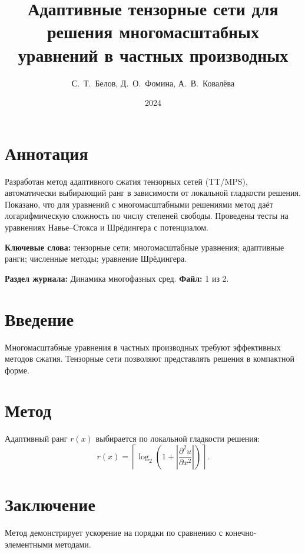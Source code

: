 \documentclass[12pt]{article}
\title{Адаптивные тензорные сети для решения многомасштабных\\ уравнений в частных производных}
\author{С.~Т.~Белов, Д.~О.~Фомина, А.~В.~Ковалёва}
\date{2024}
\begin{document}
\maketitle

\section*{Аннотация}
Разработан метод адаптивного сжатия тензорных сетей (TT/MPS), автоматически выбирающий ранг в зависимости от локальной гладкости решения. Показано, что для уравнений с многомасштабными решениями метод даёт логарифмическую сложность по числу степеней свободы. Проведены тесты на уравнениях Навье–Стокса и Шрёдингера с потенциалом.

\vspace{0.5cm}
\noindent\textbf{Ключевые слова:} тензорные сети; многомасштабные уравнения; адаптивные ранги; численные методы; уравнение Шрёдингера.

\vspace{0.3cm}
\noindent\textbf{Раздел журнала:} Динамика многофазных сред. \quad \textbf{Файл:} 1 из 2.

\section{Введение}
Многомасштабные уравнения в частных производных требуют эффективных методов сжатия. Тензорные сети позволяют представлять решения в компактной форме.

\section{Метод}
Адаптивный ранг $r(x)$ выбирается по локальной гладкости решения:
\begin{equation}
r(x) = \left\lceil \log_2 \left( 1 + \left| \frac{\partial^2 u}{\partial x^2} \right| \right) \right\rceil.
\end{equation}

\section{Заключение}
Метод демонстрирует ускорение на порядки по сравнению с конечно-элементными методами.
\end{document}
